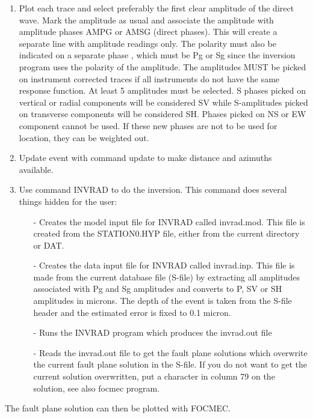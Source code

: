 \begin{enumerate}
\item Plot each trace and select preferably the first clear amplitude of the direct wave. Mark the amplitude as usual and associate the amplitude with amplitude phases AMPG or AMSG (direct phases). This will create a separate line with amplitude readings only. The polarity must also be indicated on a separate phase , which must be Pg or Sg since the inversion program uses the polarity of the amplitude. The amplitudes MUST be picked on instrument corrected traces if all instruments do not have the same response function. At least 5 amplitudes must be selected. S phases picked on vertical or radial components will be considered SV while S-amplitudes picked on transverse components will be considered SH. Phases picked on NS or EW component cannot be used. If these new phases are not to be used for location, they can be weighted out. 
\item Update event with command update to make distance and azimuths available. 
\item Use command INVRAD to do the inversion. This command does several things hidden for the user: 
\begin{itemize}
\item[-] Creates the model input file for INVRAD called invrad.mod. This file is created from the STATION0.HYP file, either from the current directory or DAT. 
\item[-] Creates the data input file for INVRAD called invrad.inp. This file is made from the current database file (S-file) by extracting all amplitudes associated with Pg and Sg amplitudes and converts to P, SV or SH amplitudes in microns. The depth of the event is taken from the S-file header and the estimated error is fixed to 0.1 micron. 
\item[-] Runs the INVRAD program which produces the invrad.out file 
\item[-] Reads the invrad.out file to get the fault plane solutions which overwrite the current fault plane solution in the S-file. If you do not want to get the current solution overwritten, put a character in column 79 on the solution, see also focmec program. 
\end{itemize}
\end{enumerate}

The fault plane solution can then be plotted with FOCMEC. 

